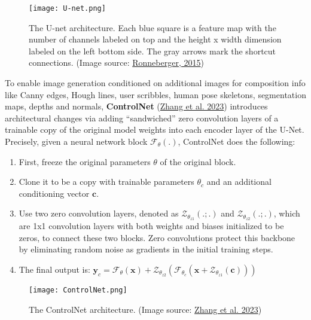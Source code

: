 \documentclass[12pt]{article}
\begin{document}
\begin{figure}[H]
    \centering
    \texttt{[image: U-net.png]}
    \caption{The U-net architecture. Each blue square is a feature map with the number of channels labeled on top and the height x width dimension labeled on the left bottom side. The gray arrows mark the shortcut connections. (Image source: \href{https://arxiv.org/abs/1505.04597}{Ronneberger, 2015})}
\end{figure}

To enable image generation conditioned on additional images for composition info like Canny edges, Hough lines, user scribbles, human pose skeletons, segmentation maps, depths and normals, \textbf{ControlNet} (\href{https://arxiv.org/abs/2302.05543}{Zhang et al. 2023}) introduces architectural changes via adding ``sandwiched'' zero convolution layers of a trainable copy of the original model weights into each encoder layer of the U-Net. Precisely, given a neural network block $\mathcal{F}_\theta(.)$, ControlNet does the following:
\begin{enumerate}
    \item First, freeze the original parameters $\theta$ of the original block.
    \item Clone it to be a copy with trainable parameters $\theta_c$ and an additional conditioning vector $\mathbf{c}$.
    \item Use two zero convolution layers, denoted as $\mathcal{Z}_{\theta_{z1}}(.;.)$ and $\mathcal{Z}_{\theta_{z2}}(.;.)$, which are 1x1 convolution layers with both weights and biases initialized to be zeros, to connect these two blocks. Zero convolutions protect this backbone by eliminating random noise as gradients in the initial training steps.
    \item The final output is: $\mathbf{y}_c = \mathcal{F}_\theta(\mathbf{x}) + \mathcal{Z}_{\theta_{z2}}(\mathcal{F}_{\theta_c}(\mathbf{x} + \mathcal{Z}_{\theta_{z1}}(\mathbf{c})))$
\end{enumerate}

\begin{figure}[H]
    \centering
    \texttt{[image: ControlNet.png]}
    \caption{The ControlNet architecture. (Image source: \href{https://arxiv.org/abs/2302.05543}{Zhang et al. 2023})}
\end{figure}
\end{document}
